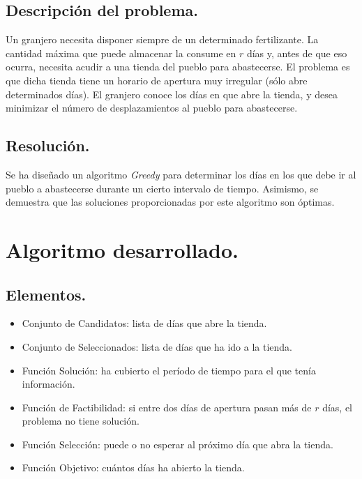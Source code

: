\documentclass[11pt,a4paper]{article}
\begin{document}
		\subsection{Descripción del problema.}

			\par
			Un granjero necesita disponer siempre de un determinado fertilizante. La cantidad máxima que puede almacenar la consume en $r$ días y, antes de que eso ocurra, necesita acudir a una tienda del pueblo para abastecerse. El problema es que dicha tienda tiene un horario de apertura muy irregular (sólo abre determinados días). El granjero conoce los días en que abre la tienda, y desea minimizar el número de desplazamientos al pueblo para abastecerse.

		\subsection{Resolución.}

			\par
			Se ha diseñado un algoritmo \textit{Greedy} para determinar los días en los que debe ir al pueblo a abastecerse durante un cierto intervalo de tiempo. Asimismo, se demuestra que las soluciones proporcionadas por este algoritmo son óptimas.

	\section{Algoritmo desarrollado.}

		\subsection{Elementos.}

			\begin{itemize}

				\item
				Conjunto de Candidatos: lista de días que abre la tienda.
				\item
				Conjunto de Seleccionados: lista de días que ha ido a la tienda.
				\item
				Función Solución: ha cubierto el período de tiempo para el que tenía información.
				\item
				Función de Factibilidad: si entre dos días de apertura pasan más de $r$ días, el problema no tiene solución.
				\item
				Función Selección: puede o no esperar al próximo día que abra la tienda.
				\item
				Función Objetivo: cuántos días ha abierto la tienda.

			\end{itemize}
\end{document}
